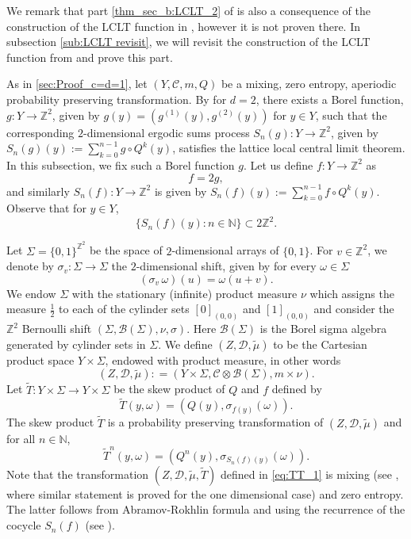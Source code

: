 \documentclass[12pt,reqno]{amsart}
\newcommand{\N}{\mathbb{N}}
\newcommand{\Z}{\mathbb{Z}}
\newcommand{\B}{\mathcal{B}}
\newcommand{\TT}{\widetilde{T}}
\newcommand{\Tmu}{\widetilde{\mu}}
\theoremstyle{definition}
\begin{document}
We remark that part \ref{thm_sec_b:LCLT_2} of   is also a consequence of the construction of the LCLT function in \cite{kosloff_Sanadhya_2024}, however it is not proven there. In subsection \ref{sub:LCLT revisit}, we will revisit the construction of the LCLT function from \cite{kosloff_Sanadhya_2024} and prove this part.

As in \cref{sec:Proof_c=d=1}, let $(Y,\mathcal{C},m,Q)$ be a mixing, zero entropy, aperiodic probability preserving transformation. By  for $d=2$, there exists a Borel function, $g: Y \rightarrow \Z^2$, given by $g (y) = (g^{(1)}(y), g^{(2)}(y))$ for $y \in Y$, such that the corresponding $2$-dimensional ergodic sums process $S_n(g) : Y \rightarrow \Z^2$, given by $S_n(g) (y):=\sum_{k=0}^{n-1}g\circ Q^k (y)$,
satisfies the lattice local central limit theorem. In this subsection, we fix such a Borel function $g$. Let us define $f: Y \rightarrow \Z^2$ as 
\begin{equation}\label{eq:def_f}
    f = 2g,
\end{equation} and similarly $S_n(f) : Y \rightarrow \Z^2$ is given by $S_n(f) (y):=\sum_{k=0}^{n-1}f\circ Q^k (y)$. Observe that for $y \in Y$, 
\[\{S_n(f)(y): n \in \N \} \subset 2\Z^2.\]   

Let $\Sigma = \{0,1\}^{\Z^2}$ be the space of $2$-dimensional arrays of $\{0,1\}$. For $v \in \Z^2$, we denote by $\sigma_v : \Sigma \rightarrow \Sigma$ the $2$-dimensional shift, given by for every $\omega\in \Sigma$
\[
(\sigma_v \, \omega) (u) = \omega (u+v).
\] 
We endow $\Sigma$ with the stationary (infinite) product measure $\nu$ which assigns the measure $\frac{1}{2}$ to each of the cylinder sets $[0]_{(0,0)}$ and $[1]_{(0,0)}$ and consider the $\Z^2$ Bernoulli shift $(\Sigma, \B(\Sigma), \nu, \sigma)$. Here $\B(\Sigma)$ is the Borel sigma algebra generated by cylinder sets in $\Sigma$. We define $(Z,\mathcal{D},\Tmu)$ to be the Cartesian product space $Y \times \Sigma$, endowed with product measure, in other words
\[(Z,\mathcal{D},\Tmu) : = (Y \times \Sigma, \mathcal{C} \otimes \B(\Sigma), m \times \nu).\]
Let  $\TT : Y \times \Sigma \rightarrow Y \times \Sigma$ be the skew product of $Q$ and $f$ defined by 
\begin{equation}\label{eq:TT_1}
    \TT (y, \omega) = (Q (y), \sigma_{f(y)} (\omega)).
\end{equation}
The skew product $\TT$ is a probability preserving transformation of $(Z,\mathcal{D},\Tmu)$ and for all $n\in\N$,
\begin{equation}\label{eq:TT^n_2}
    \TT^n (y, \omega) = (Q^n(y), \sigma_{S_n(f)(y)} (\omega)).
\end{equation} Note that the transformation $(Z,\mathcal{D},\Tmu,\TT)$ defined in \eqref{eq:TT_1} is  mixing (see , where similar statement is proved for the one dimensional case) and zero entropy. The latter follows from Abramov-Rokhlin formula and using the
recurrence of the cocycle $S_n(f)$ (see \cite[
Proposition 4.3]{kosloff_Sanadhya_2024}).
\end{document}
